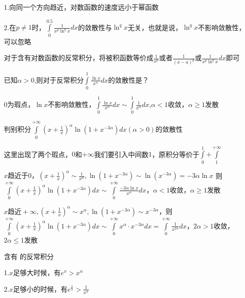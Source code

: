 \documentclass[lang=cn,10pt]{elegantbook}
\begin{document}
\begin{conclusion}
	
	1.向同一个方向趋近，对数函数的速度远小于幂函数
	
	2.在$p\ne1$时，$\int\limits_0^{0.5}{\frac{1}{x^p\ln ^qx}dx}$的敛散性与$\ln ^qx$无关，也就是说，$\ln ^qx$不影响敛散性，可以忽略
\end{conclusion}

对于含有对数函数的反常积分，将被积函数等价成$\frac{1}{x^{p}}$或者$\frac{1}{(x-a)^{p}}$或$\frac{1}{x^p\ln ^qx}dx$即可
\begin{example}
	已知$\alpha>0$,则对于反常积分$\int\limits_0^1{\frac{\ln x}{x^{\alpha}}dx}$的敛散性是？
\end{example}
\begin{solution}
	
	$0$为瑕点，$\ln x$不影响敛散性，$\int\limits_0^1{\frac{\ln x}{x^{\alpha}}dx}\sim \int\limits_0^1{\frac{1}{x^{\alpha}}dx}$,$\alpha<1 $收敛，$\alpha \ge1 $发散
\end{solution}
\begin{example}
	判别积分$\int\limits_0^{+\infty}{\left( x+\frac{1}{x} \right) ^{\alpha}\ln \left( 1+x^{-3\alpha} \right) dx\left( \alpha >0 \right)}$的敛散性
\end{example}
\begin{solution}
	
	这里出现了两个瑕点，$0$和$+\infty$我们要引入中间数$1$，原积分等价于$\int\limits_0^1{+\int\limits_1^{+\infty}}$
	
	$
	x\text{趋近于}0\text{，}\left( x+\frac{1}{x} \right) ^{\alpha}\sim \frac{1}{x^{\alpha}},\ln \left( 1+x^{-3\alpha} \right) \sim \ln \left( x^{-3\alpha} \right) =-3\alpha \ln x$
	则$\int\limits_0^{+\infty}{}\left( x+\frac{1}{x} \right) ^{\alpha}\ln \left( 1+x^{-3\alpha} \right) dx\sim \int\limits_0^{+\infty}{\frac{-3\alpha \ln x}{x^{\alpha}}}dx
	$，$\alpha<1 $收敛，$\alpha \ge1 $发散
	
	$x\text{趋近}+\infty ,\left( x+\frac{1}{x} \right) ^{\alpha}\sim x^{\alpha},\ln \left( 1+x^{-3\alpha} \right) \sim x^{-3\alpha}
	$，则$\int\limits_0^{+\infty}{}\left( x+\frac{1}{x} \right) ^{\alpha}\ln \left( 1+x^{-3\alpha} \right) dx\sim \int\limits_0^{+\infty}{x^{\alpha}}\cdot x^{-3\alpha}dx=\int\limits_0^{+\infty}{\frac{1}{x^{2\alpha}}}dx
	$，$2\alpha >1$收敛，$2\alpha\le1$发散
	
\end{solution}
含有{\color{red} }的反常积分
\begin{conclusion}
	
	1.$x$足够大时候，有$e^{x}>x^{\alpha}$
	
	2.$x$足够小的时候，有$e^{\frac{1}{x}}>\frac{1}{x^{\alpha}}$
\end{conclusion}
\end{document}

